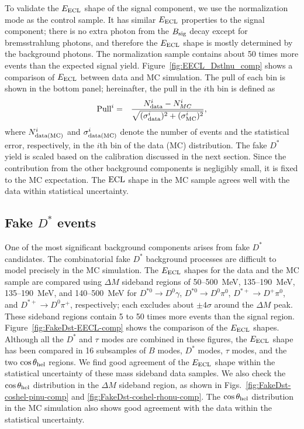 \documentclass[aps,prd,twocolumn,superscriptaddress,showpacs,preprintnumbers,amsmath,amssymb]{revtex4-1}
\begin{document}
To validate the $E_{\rm ECL}$ shape of the signal component, we use the normalization mode as the control sample. It has similar $E_{\rm ECL}$ properties to the signal component; there is no extra photon from the $B_{\rm sig}$ decay except for bremsstrahlung photons, and therefore the $E_{\rm ECL}$ shape is mostly determined by the background photons. The normalization sample contains about 50 times more events than the expected signal yield. Figure~\ref{fig:EECL_Dstlnu_comp} shows a comparison of $E_{\rm ECL}$ between data and MC simulation. The pull of each bin is shown in the bottom panel; hereinafter, the pull in the $i$th bin is defined as
\begin{eqnarray}
  \text{Pull}^i &=& \frac{N_{\rm data}^i - N_{MC}^i}{\sqrt{(\sigma_{\rm data}^i)^2 + (\sigma_{\rm MC}^i)^2}},
\end{eqnarray}
where $N_{\rm data (MC)}^i$ and $\sigma_{\rm data (MC)}^i$ denote the number of events and the statistical error, respectively, in the $i$th bin of the data (MC) distribution. The fake $D^*$ yield is scaled based on the calibration discussed in the next section. Since the contribution from the other background components is negligibly small, it is fixed to the MC expectation. The ${\rm ECL}$ shape in the MC sample agrees well with the data within statistical uncertainty.

\subsection{Fake \textbf{\boldmath$D^*$} events}\label{sec:FakeDst}

One of the most significant background components arises from fake $D^*$ candidates. The combinatorial fake $D^*$ background processes are difficult to model precisely in the MC simulation. The $E_{\rm ECL}$ shapes for the data and the MC sample are compared using $\Delta M$ sideband regions of 50--500~MeV, 135--190~MeV, 135--190~MeV, and 140--500~MeV for $D^{*0} \rightarrow D^0 \gamma$, $D^{*0} \rightarrow D^0 \pi^0$, $D^{*+} \rightarrow D^+ \pi^0$, and $D^{*+} \rightarrow D^0 \pi^+$, respectively; each excludes about $\pm 4\sigma$ around the $\Delta M$ peak. These sideband regions contain 5 to 50 times more events than the signal region. Figure~\ref{fig:FakeDst-EECL-comp} shows the comparison of the $E_{\rm ECL}$ shapes. Although all the $D^*$ and $\tau$ modes are combined in these figures, the $E_{\rm ECL}$ shape has been compared in 16 subsamples of $B$ modes, $D^*$ modes, $\tau$ modes, and the two $\cos\theta_{\rm hel}$ regions. We find good agreement of the $E_{\rm ECL}$ shape within the statistical uncertainty of these mass sideband data samples. We also check the $\cos\theta_{\rm hel}$ distribution in the $\Delta M$ sideband region, as shown in Figs.~\ref{fig:FakeDst-coshel-pinu-comp} and \ref{fig:FakeDst-coshel-rhonu-comp}. The $\cos\theta_{\rm hel}$ distribution in the MC simulation also shows good agreement with the data within the statistical uncertainty.
\end{document}
